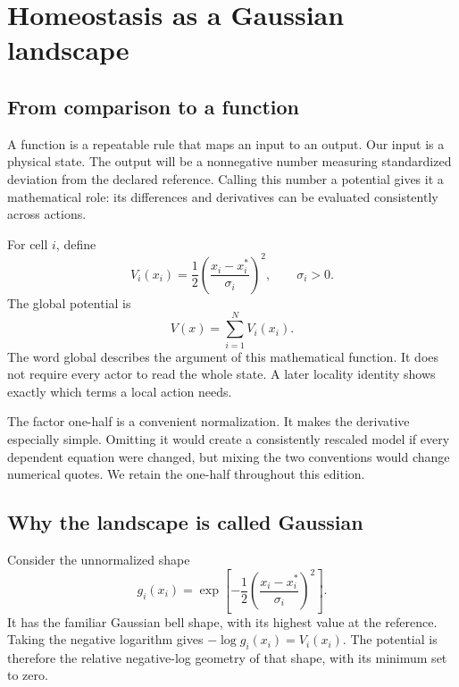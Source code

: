 \chapter{Homeostasis as a Gaussian landscape}\label{ch:potential}

\section{From comparison to a function}
A function is a repeatable rule that maps an input to an output. Our input is a physical state. The output will be a nonnegative number measuring standardized deviation from the declared reference. Calling this number a potential gives it a mathematical role: its differences and derivatives can be evaluated consistently across actions.

For cell \(i\), define
\begin{equation}\label{eq:local-gaussian-potential}
 V_i(x_i)=\frac12\left(\frac{x_i-x_i^*}{\sigma_i}\right)^2,
 \qquad \sigma_i>0.
\end{equation}
The global potential is
\begin{equation}\label{eq:global-gaussian-potential}
 V(x)=\sum_{i=1}^{N}V_i(x_i).
\end{equation}
The word global describes the argument of this mathematical function. It does not require every actor to read the whole state. A later locality identity shows exactly which terms a local action needs.

The factor one-half is a convenient normalization. It makes the derivative especially simple. Omitting it would create a consistently rescaled model if every dependent equation were changed, but mixing the two conventions would change numerical quotes. We retain the one-half throughout this edition.


\section{Why the landscape is called Gaussian}
Consider the unnormalized shape
\begin{equation}
 g_i(x_i)=\exp\left[-\frac12
          \left(\frac{x_i-x_i^*}{\sigma_i}\right)^2\right].
\end{equation}
It has the familiar Gaussian bell shape, with its highest value at the reference. Taking the negative logarithm gives \(-\log g_i(x_i)=V_i(x_i)\). The potential is therefore the relative negative-log geometry of that shape, with its minimum set to zero.


